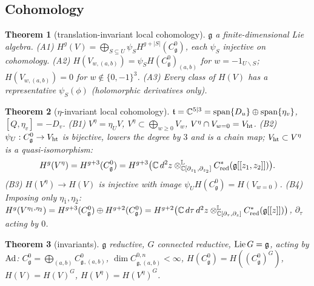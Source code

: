 \documentclass[10pt,a4paper]{article}
\numberwithin{equation}{section}
\newtheorem{theorem}{Theorem}[section]
\theoremstyle{definition}
\theoremstyle{remark}
\newcommand{\g}{\mathfrak g}
\newcommand{\Vht}{V_{\rm ht}}
\newcommand{\Veta}{V^{\eta}}
\newcommand{\Cg}{C^0_{\g}}
\begin{document}
\subsection{Cohomology}

\begin{theorem}[translation-invariant local cohomology]\label{thm-A}
$\g$ a finite-dimensional Lie algebra.
(A1) $H^g(V)=\bigoplus_{S\subseteq U}\psi_SH^{g+|S|}(\Cg)$, each $\psi_S$ injective on cohomology.
(A2) $H(V_{w,(a,b)})=\psi_SH(\Cg)_{(a,b)}$ for $w=-1_{U\smallsetminus S}$; $H(V_{w,(a,b)})=0$ for $w\notin\{0,-1\}^3$.
(A3) Every class of $H(V)$ has a representative $\psi_S(\phi)$ (holomorphic derivatives only).
\end{theorem}

\begin{theorem}[$\eta$-invariant local cohomology]\label{thm-B}
$\mathfrak t=\mathbb C^{5|3}={\rm span}\{D_u\}\oplus{\rm span}\{\eta_v\}$, $[Q,\eta_v]=-D_v$.
(B1) $\Veta=\eta_UV$, $\Veta\subset\bigoplus_{w\ge0}V_w$, $\Veta\cap V_{w=0}=\Vht$.
(B2) $\psi_U:\Cg\to\Vht$ is bijective, lowers the degree by $3$ and is a chain map; $\Vht\subset\Veta$ is a quasi-isomorphism:
\begin{equation}
H^g(\Veta)=H^{g+3}(\Cg)=H^{g+3}\big(\mathbb C\,d^2z\otimes^{\mathbb L}_{\mathbb C[\partial_{z_1},\partial_{z_2}]}C^*_{\rm red}(\g[[z_1,z_2]])\big).
\end{equation}
(B3) $H(\Veta)\to H(V)$ is injective with image $\psi_UH(\Cg)=H(V_{w=0})$.
(B4) Imposing only $\eta_{\bar1},\eta_{\bar2}$: $H^g(V^{\eta_{\bar1},\eta_{\bar2}})=H^{g+3}(\Cg)\oplus H^{g+2}(\Cg)=H^{g+2}\big(\mathbb C\,d\tau\,d^2z\otimes^{\mathbb L}_{\mathbb C[\partial_\tau,\partial_z]}C^*_{\rm red}(\g[[z]])\big)$, $\partial_\tau$ acting by $0$.
\end{theorem}

\begin{theorem}[invariants]\label{thm-C}
$\g$ reductive, $G$ connected reductive, ${\rm Lie}\,G=\g$, acting by ${\rm Ad}$: $\Cg=\bigoplus_{(a,b)}\Cg{}_{,(a,b)}$, $\dim C^{0,n}_{\g,(a,b)}<\infty$, $H(\Cg)=H((\Cg)^G)$, $H(V)=H(V)^G$, $H(\Veta)=H(\Veta)^G$.
\end{theorem}
\end{document}
